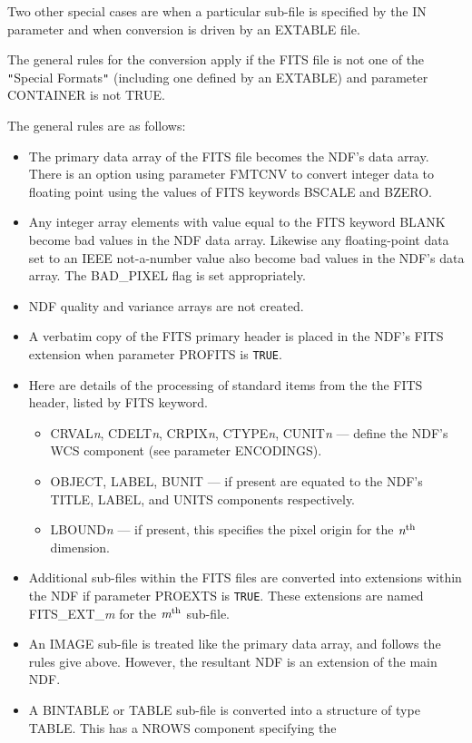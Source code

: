 \documentclass[twoside,11pt]{article}
\newcommand{\xref}[3]{#1}
\newcommand{\ssthitemlist}[1]{
  \latexonly{
  \mbox{} \\
  \vspace{-3.5ex}
  }
  \begin{itemize}
     #1
  \end{itemize}
}
\newcommand{\sstitem}{\item}
\newcommand{\sstitem}{\item}
\begin{document}
{{      Two other special cases are when a particular sub-file is specified by
      the IN parameter and when conversion is driven by an EXTABLE file.

      The general rules for the conversion apply if the FITS file is not
      one of the \texttt{"}Special Formats\texttt{"} (including one defined by an EXTABLE)
      and parameter CONTAINER is not TRUE.

      The general rules are as follows:
      \ssthitemlist{
         \sstitem 
         The primary data array of the FITS file becomes the NDF's data
         array. There is an option using parameter FMTCNV to convert
         integer data to floating point using the values of FITS keywords
         BSCALE and BZERO.
         \sstitem
         Any integer array elements with value equal to the FITS
         keyword BLANK become \xref{bad}{sun95}{se_badmasking} values in
         the NDF data array.  Likewise any floating-point data set to an
         IEEE not-a-number value also become bad values in the NDF's data
         array.  The BAD\_PIXEL flag is set appropriately.
         \sstitem
         NDF quality and variance arrays are not created.
         \sstitem
         A verbatim copy of the FITS primary header is placed in the
         NDF's FITS extension when parameter PROFITS is \texttt{TRUE}.
         \sstitem
         Here are details of the processing of standard items from the
         the FITS header, listed by FITS keyword.
         \ssthitemlist{
            \sstitem
            CRVAL\textit{n}, CDELT\textit{n}, CRPIX\textit{n}, CTYPE\textit{n},
            CUNIT\textit{n} --- define the NDF's WCS component (see parameter 
            ENCODINGS).
            \sstitem
            OBJECT, LABEL, BUNIT --- if present are equated to the NDF's
            TITLE, LABEL, and UNITS components respectively.
            \sstitem
            LBOUND\textit{n} --- if present, this specifies the pixel origin
            for the $\textit{n}^{\rm th}$ dimension.
         }
         \sstitem
         Additional sub-files within the FITS files are converted into
         extensions within the NDF if parameter PROEXTS is \texttt{TRUE}.
         These extensions are named FITS\_EXT\_\textit{m} for the 
         $\textit{m}^{\rm th}$ sub-file.
         \sstitem
         An IMAGE sub-file is treated like the primary data array, and
         follows the rules give above. However, the resultant NDF is an
         extension of the main NDF.
         \sstitem
         A BINTABLE or TABLE sub-file is converted into a structure
         of type TABLE.  This has a NROWS component specifying the
}}}
\end{document}
